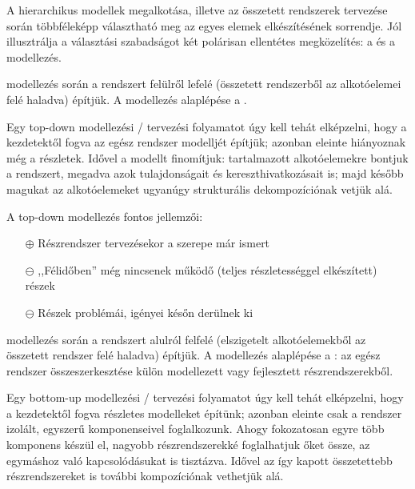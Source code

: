 A hierarchikus modellek megalkotása, illetve az összetett rendszerek tervezése során többféleképp választható meg az egyes elemek elkészítésének sorrendje. Jól illusztrálja a választási szabadságot két polárisan ellentétes megközelítés: a  és a  modellezés.

\begin{definicio}
	 modellezés során a rendszert felülről lefelé (összetett rendszerből az alkotóelemei felé haladva) építjük. A modellezés alaplépése a .
\end{definicio}

Egy top-down modellezési / tervezési folyamatot úgy kell tehát elképzelni, hogy a kezdetektől fogva az egész rendszer modelljét építjük; azonban eleinte hiányoznak még a részletek. Idővel a modellt finomítjuk: tartalmazott alkotóelemekre bontjuk a rendszert, megadva azok tulajdonságait és kereszthivatkozásait is; majd később magukat az alkotóelemeket ugyanúgy strukturális dekompozíciónak vetjük alá.

A top-down modellezés fontos jellemzői:

\begin{itemize}
	\item[$\oplus$] Részrendszer tervezésekor a szerepe már ismert
	\item[$\ominus$] ,,Félidőben'' még nincsenek működő (teljes részletességgel elkészített) részek
	\item[$\ominus$] Részek problémái, igényei későn derülnek ki
\end{itemize}

\begin{definicio}
	 modellezés során a rendszert alulról felfelé (elszigetelt alkotóelemekből az összetett rendszer felé haladva) építjük. A modellezés alaplépése a : az egész rendszer összeszerkesztése külön modellezett vagy fejlesztett részrendszerekből.
\end{definicio}

Egy bottom-up modellezési / tervezési folyamatot úgy kell tehát elképzelni, hogy a kezdetektől fogva részletes modelleket építünk; azonban eleinte csak a rendszer izolált, egyszerű komponenseivel foglalkozunk. Ahogy fokozatosan egyre több komponens készül el, nagyobb részrendszerekké foglalhatjuk őket össze, az egymáshoz való kapcsolódásukat is tisztázva. Idővel az így kapott összetettebb részrendszereket is további kompozíciónak vethetjük alá.

